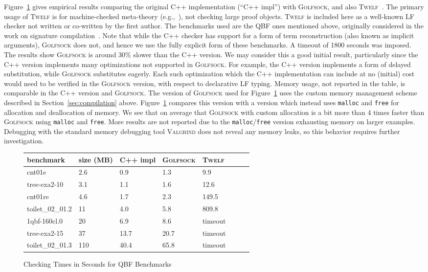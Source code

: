 \documentclass[preprint,natbib]{sigplanconf}
\begin{document}
Figure~\ref{fig:qbf} gives empirical results comparing the original
C++ implementation (``C++ impl'') with \textsc{Golfsock}, and also
\textsc{Twelf}~\cite{PfS98}.  The primary usage of \textsc{Twelf} is
for machine-checked meta-theory (e.g.,~\cite{lee+07}), not checking
large proof objects.  \textsc{Twelf} is included here as a well-known
LF checker not written or co-written by the first author.  The
benchmarks used are the QBF ones mentioned above, originally
considered in the work on signature compilation~\cite{zeller07}.  Note
that while the C++ checker has support for a form of term
reconstruction (also known as implicit arguments), \textsc{Golfsock}
does not, and hence we use the fully explicit form of these
benchmarks.  A timeout of 1800 seconds was imposed.  The results show
\textsc{Golfsock} is around 30\% slower than the C++ version.  We may
consider this a good initial result, particularly since the C++
version implements many optimizations not supported in
\textsc{Golfsock}.  For example, the C++ version implements a form of
delayed substitution, while \textsc{Golfsock} substitutes eagerly.
Each such optimization which the C++ implementation can include at no
(initial) cost would need to be verified in the \textsc{Golfsock}
version, with respect to declarative LF typing.  Memory usage, not
reported in the table, is comparable in the C++ version and
\textsc{Golfsock}.  The version of \textsc{Golfsock} used for
Figure~\ref{fig:qbf} uses the custom memory management scheme
described in Section~\ref{sec:compilation} above.
Figure~\ref{fig:qbf} compares this version with a version which
instead uses \texttt{malloc} and \texttt{free} for allocation and
deallocation of memory.  We see that on average that \textsc{Golfsock}
with custom allocation is a bit more than 4 times faster than
\textsc{Golfsock} using \texttt{malloc} and \texttt{free}.  More
results are not reported due to the \texttt{malloc}/\texttt{free}
version exhausting memory on larger examples.  Debugging with the
standard memory debugging tool \textsc{Valgrind} does not reveal any
memory leaks, so this behavior requires further investigation.


\begin{figure}
\footnotesize
\begin{center}
\begin{tabular}{|l|l|l|l|l|l|l|l|}
\hline
\textbf{benchmark} & \textbf{size (MB)} & C++ impl & \textsc{Golfsock} & \textsc{Twelf}
\\
\hline
cnt01e
&
2.6
&
0.9
&
1.3
&
9.9 
\\
tree-exa2-10
&
3.1
&
1.1
&
1.6
&
12.6
\\
cnt01re
&
4.6
&
1.7
&
2.3
&
149.5
\\
toilet\_02\_01.2
&
11
&
4.0
&
5.8
&
809.8
\\
1qbf-160cl.0
&
20
&
6.9
&
8.6
&
timeout
\\
tree-exa2-15
&
37
&
13.7
&
20.7
&
timeout 
\\
toilet\_02\_01.3
&
110
&
40.4
&
65.8
&
timeout
\\
\hline
\end{tabular}
\end{center}
\caption{\label{fig:qbf}Checking Times in Seconds for QBF Benchmarks}
\end{figure}
\end{document}
